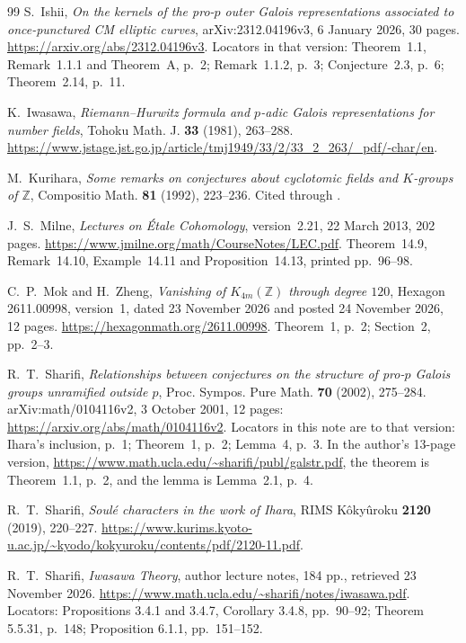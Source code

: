 \documentclass[11pt]{article}
\theoremstyle{definition}
\numberwithin{equation}{section}
\begin{document}
\begin{thebibliography}{99}
S.~Ishii, \emph{On the kernels of the pro-$p$ outer Galois representations
associated to once-punctured CM elliptic curves},
arXiv:2312.04196v3, 6 January 2026, 30 pages.
\url{https://arxiv.org/abs/2312.04196v3}.
Locators in that version: Theorem~1.1, Remark~1.1.1 and Theorem~A, p.~2; Remark~1.1.2, p.~3;
Conjecture~2.3, p.~6; Theorem~2.14, p.~11.

K.~Iwasawa, \emph{Riemann--Hurwitz formula and $p$-adic Galois
representations for number fields},
Tohoku Math. J. \textbf{33} (1981), 263--288.
\url{https://www.jstage.jst.go.jp/article/tmj1949/33/2/33_2_263/_pdf/-char/en}.

M.~Kurihara, \emph{Some remarks on conjectures about cyclotomic fields and
$K$-groups of $\mathbb Z$}, Compositio Math. \textbf{81} (1992), 223--236.
Cited through \cite[Chapter~VI, Theorem~10.9]{WeibelKbook}.

J.~S.~Milne,
\emph{Lectures on \textup{\'Etale} Cohomology},
version~2.21, 22 March 2013, 202 pages.
\url{https://www.jmilne.org/math/CourseNotes/LEC.pdf}.
Theorem~14.9, Remark~14.10, Example~14.11 and Proposition~14.13,
printed pp.~96--98.

C.~P.~Mok and H.~Zheng, \emph{Vanishing of $K_{4m}(\mathbb Z)$ through degree $120$},
Hexagon 2611.00998, version~1, dated 23 November 2026 and posted 24 November 2026, 12 pages.
\url{https://hexagonmath.org/2611.00998}.
Theorem~1, p.~2; Section~2, pp.~2--3.

R.~T.~Sharifi, \emph{Relationships between conjectures on the structure
of pro-$p$ Galois groups unramified outside $p$},
Proc. Sympos. Pure Math. \textbf{70} (2002), 275--284.
arXiv:math/0104116v2, 3 October 2001, 12 pages: \url{https://arxiv.org/abs/math/0104116v2}.
Locators in this note are to that version: Ihara's inclusion, p.~1; Theorem~1, p.~2; Lemma~4, p.~3.
In the author's 13-page version, \url{https://www.math.ucla.edu/~sharifi/publ/galstr.pdf},
the theorem is Theorem~1.1, p.~2, and the lemma is Lemma~2.1, p.~4.

R.~T.~Sharifi, \emph{Soul\'e characters in the work of Ihara}, RIMS K\^oky\^uroku
\textbf{2120} (2019), 220--227.
\url{https://www.kurims.kyoto-u.ac.jp/~kyodo/kokyuroku/contents/pdf/2120-11.pdf}.

R.~T.~Sharifi, \emph{Iwasawa Theory}, author lecture notes, 184 pp.,
retrieved 23 November 2026.
\url{https://www.math.ucla.edu/~sharifi/notes/iwasawa.pdf}.
Locators: Propositions 3.4.1 and 3.4.7, Corollary 3.4.8, pp.~90--92;
Theorem 5.5.31, p.~148; Proposition 6.1.1, pp.~151--152.


\end{thebibliography}
\end{document}
